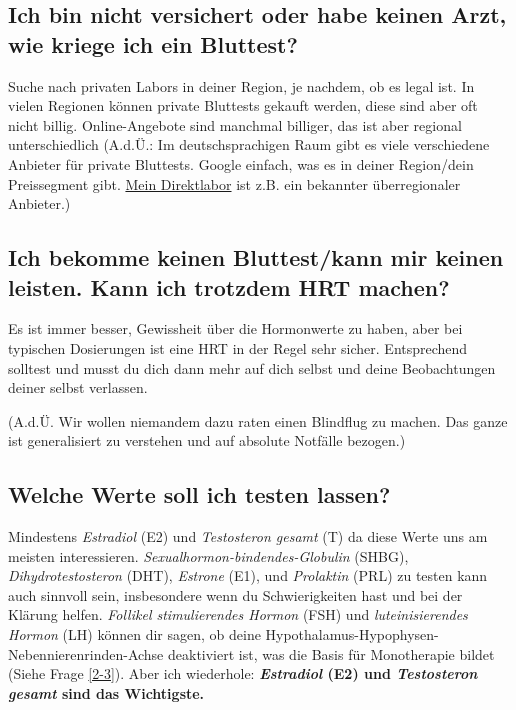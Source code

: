\documentclass{article}
\begin{document}
\subsection{Ich bin nicht versichert oder habe keinen Arzt, wie kriege ich ein Bluttest?}

Suche nach privaten Labors in deiner Region, je nachdem, ob es legal ist. In vielen Regionen können private Bluttests gekauft werden, diese sind aber oft nicht billig. Online-Angebote sind manchmal billiger, das ist aber regional unterschiedlich (A.d.Ü.: Im deutschsprachigen Raum gibt es viele verschiedene Anbieter für private Bluttests. Google einfach, was es in deiner Region/dein Preissegment gibt. \href{https://www.meindirektlabor.de/}{Mein Direktlabor} ist z.B. ein bekannter überregionaler Anbieter.)

\subsection{Ich bekomme keinen Bluttest/kann mir keinen leisten. Kann ich trotzdem HRT machen?}

Es ist immer besser, Gewissheit über die Hormonwerte zu haben, aber bei typischen Dosierungen ist eine HRT in der Regel sehr sicher. Entsprechend solltest und musst du dich dann mehr auf dich selbst und deine Beobachtungen  deiner selbst verlassen.

(A.d.Ü. Wir wollen niemandem dazu raten einen Blindflug zu machen. Das ganze ist generalisiert zu verstehen und auf absolute Notfälle bezogen.)

\subsection{Welche Werte soll ich testen lassen?}

Mindestens \textit{Estradiol} (E2) und \textit{Testosteron gesamt} (T) da diese Werte uns am meisten interessieren. \textit{Sexualhormon-bindendes-Globulin} (SHBG), \textit{Dihydrotestosteron} (DHT), \textit{Estrone} (E1), und \textit{Prolaktin }(PRL) zu testen kann auch sinnvoll sein, insbesondere wenn du Schwierigkeiten hast und bei der Klärung helfen. \textit{Follikel stimulierendes Hormon} (FSH) und \textit{luteinisierendes Hormon} (LH) können dir sagen, ob deine Hypothalamus-Hypophysen-Nebennierenrinden-Achse deaktiviert ist, was die Basis für Monotherapie bildet (Siehe Frage \ref{2-3}). Aber ich wiederhole: \textbf{\textit{Estradiol} (E2) und \textit{Testosteron gesamt} sind das Wichtigste. }
\end{document}
